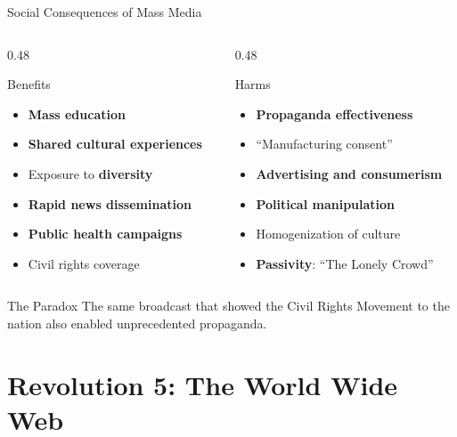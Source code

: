 \documentclass[aspectratio=169,11pt]{beamer}
\begin{document}
\begin{frame}{Social Consequences of Mass Media}
\begin{columns}
\begin{column}{0.48\textwidth}
\begin{block}{\faThumbsUp\hspace{0.3em}Benefits}
\begin{itemize}
  \item \textbf{Mass education}
  \item \textbf{Shared cultural experiences}
  \item Exposure to \textbf{diversity}
  \item \textbf{Rapid news dissemination}
  \item \textbf{Public health campaigns}
  \item Civil rights coverage
\end{itemize}
\end{block}
\end{column}

\begin{column}{0.48\textwidth}
\begin{alertblock}{\faThumbsDown\hspace{0.3em}Harms}
\begin{itemize}
  \item \textbf{Propaganda effectiveness}
  \item ``Manufacturing consent''
  \item \textbf{Advertising and consumerism}
  \item \textbf{Political manipulation}
  \item Homogenization of culture
  \item \textbf{Passivity}: ``The Lonely Crowd''
\end{itemize}
\end{alertblock}
\end{column}
\end{columns}

\vspace{0.5em}
\begin{exampleblock}{The Paradox}
The same broadcast that showed the Civil Rights Movement to the nation also enabled unprecedented propaganda.
\end{exampleblock}
\end{frame}


\section{Revolution 5: The World Wide Web}
\end{document}
